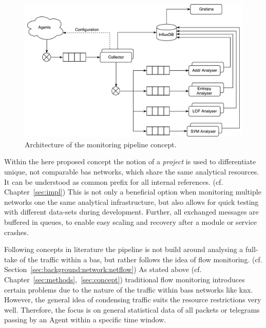 \begin{figure}[h]
	\centering
	\includegraphics[width=\textwidth]{figures/300-concept-architecture.pdf}
	\caption[Pipeline Architecture]{Architecture of the monitoring pipeline concept.  }
	\label{fig:concept:architecture}
\end{figure}

Within the here proposed concept the notion of a \emph{project} is used to differentiate unique, not comparable \gls{bas} networks, which share the same analytical resources. It can be understood as common prefix for all internal references. (cf. Chapter~\ref{sec:impl})
This is not only a beneficial option when monitoring multiple networks one the same analytical infrastructure, but also allows for quick testing with different data-sets during development.
Further, all exchanged messages are buffered in queues, to enable easy scaling and recovery after a module or service crashes.

Following concepts in literature \parencite[][]{Celeda2012,Pan2014} the pipeline is not build around analysing a full-take of the traffic within a \gls{bas}, but rather follows the idea of flow monitoring. (cf. Section~\ref{sec:background:network:netflow})
As stated above (cf. Chapter~\ref{sec:methods},~\ref{sec:concept}) traditional flow monitoring introduces certain problems due to the nature of the traffic within \glspl{bas} networks like \gls{knx}. However, the general idea of condensing traffic suits the resource restrictions very well.
Therefore, the focus is on general statistical data of all packets or telegrams passing by an Agent within a specific time window.

